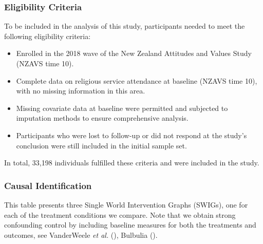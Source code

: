 \documentclass[
  single column]{article}
\providecommand{\tightlist}{%
  \setlength{\itemsep}{0pt}\setlength{\parskip}{0pt}}\usepackage{longtable,booktabs,array}
\begin{document}
\subsubsection{Eligibility Criteria}\label{eligibility-criteria}

To be included in the analysis of this study, participants needed to
meet the following eligibility criteria:

\begin{itemize}
\tightlist
\item
  Enrolled in the 2018 wave of the New Zealand Attitudes and Values
  Study (NZAVS time 10).
\item
  Complete data on religious service attendance at baseline (NZAVS time
  10), with no missing information in this area.
\item
  Missing covariate data at baseline were permitted and subjected to
  imputation methods to ensure comprehensive analysis.
\item
  Participants who were lost to follow-up or did not respond at the
  study's conclusion were still included in the initial sample set.
\end{itemize}

In total, 33,198 individuals fulfilled these criteria and were included
in the study.

\subsubsection{Causal Identification}\label{causal-identification}

\begin{table}

\caption{\label{tbl-02}This table presents three Single World
Intervention Graphs (SWIGs), one for each of the treatment conditions we
compare. Note that we obtain strong confounding control by including
baseline measures for both the treatments and outcomes, see VanderWeele
\emph{et al.} (), Bulbulia
().}

\centering{

\lmtptablethree

}

\end{table}%
\end{document}

